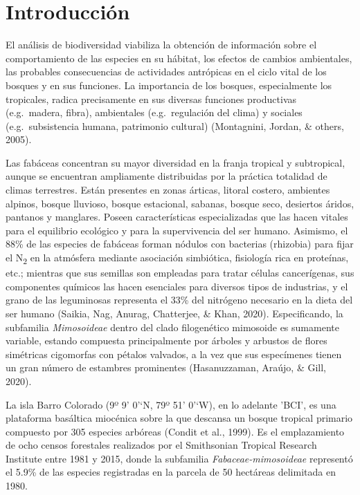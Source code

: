\documentclass[11pt,]{article}
\begin{document}
\vskip 6.5pt


\noindent  \section{Introducción}\label{introducciuxf3n}

El análisis de biodiversidad viabiliza la obtención de información sobre
el comportamiento de las especies en su hábitat, los efectos de cambios
ambientales, las probables consecuencias de actividades antrópicas en el
ciclo vital de los bosques y en sus funciones. La importancia de los
bosques, especialmente los tropicales, radica precisamente en sus
diversas funciones productivas (e.g.~madera, fibra), ambientales
(e.g.~regulación del clima) y sociales (e.g.~subsistencia humana,
patrimonio cultural) (Montagnini, Jordan, \& others, 2005).

Las fabáceas concentran su mayor diversidad en la franja tropical y
subtropical, aunque se encuentran ampliamente distribuidas por la
práctica totalidad de climas terrestres. Están presentes en zonas
árticas, litoral costero, ambientes alpinos, bosque lluvioso, bosque
estacional, sabanas, bosque seco, desiertos áridos, pantanos y
manglares. Poseen características especializadas que las hacen vitales
para el equilibrio ecológico y para la supervivencia del ser humano.
Asimismo, el 88\% de las especies de fabáceas forman nódulos con
bacterias (rhizobia) para fijar el N\textsubscript{2} en la atmósfera
mediante asociación simbiótica, fisiología rica en proteínas, etc.;
mientras que sus semillas son empleadas para tratar células
cancerígenas, sus componentes químicos las hacen esenciales para
diversos tipos de industrias, y el grano de las leguminosas representa
el 33\% del nitrógeno necesario en la dieta del ser humano (Saikia, Nag,
Anurag, Chatterjee, \& Khan, 2020). Especificando, la subfamilia
\emph{Mimosoideae} dentro del clado filogenético mimosoide es sumamente
variable, estando compuesta principalmente por árboles y arbustos de
flores simétricas cigomorfas con pétalos valvados, a la vez que sus
especímenes tienen un gran número de estambres prominentes
(Hasanuzzaman, Araújo, \& Gill, 2020).

La isla Barro Colorado (9º 9' 0'`N, 79º 51' 0'`W), en lo adelante 'BCI',
es una plataforma basáltica miocénica sobre la que descansa un bosque
tropical primario compuesto por 305 especies arbóreas (Condit et al.,
1999). Es el emplazamiento de ocho censos forestales realizados por el
Smithsonian Tropical Research Institute entre 1981 y 2015, donde la
subfamilia \emph{Fabaceae-mimosoideae} representó el 5.9\% de las
especies registradas en la parcela de 50 hectáreas delimitada en 1980.
\end{document}
